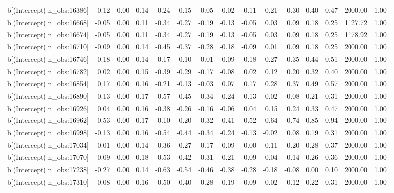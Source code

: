 \begin{table}[ht]
\begin{tabular}{rrrrrrrrrrrrrrr}
  b[(Intercept) n\_obs:16386] & 0.12 & 0.00 & 0.14 & -0.24 & -0.15 & -0.05 & 0.02 & 0.11 & 0.21 & 0.30 & 0.40 & 0.47 & 2000.00 & 1.00 \\ 
  b[(Intercept) n\_obs:16668] & -0.05 & 0.00 & 0.11 & -0.34 & -0.27 & -0.19 & -0.13 & -0.05 & 0.03 & 0.09 & 0.18 & 0.25 & 1127.72 & 1.00 \\ 
  b[(Intercept) n\_obs:16674] & -0.05 & 0.00 & 0.11 & -0.34 & -0.27 & -0.19 & -0.13 & -0.05 & 0.03 & 0.09 & 0.18 & 0.25 & 1178.92 & 1.00 \\ 
  b[(Intercept) n\_obs:16710] & -0.09 & 0.00 & 0.14 & -0.45 & -0.37 & -0.28 & -0.18 & -0.09 & 0.01 & 0.09 & 0.18 & 0.25 & 2000.00 & 1.00 \\ 
  b[(Intercept) n\_obs:16746] & 0.18 & 0.00 & 0.14 & -0.17 & -0.10 & 0.01 & 0.09 & 0.18 & 0.27 & 0.35 & 0.44 & 0.51 & 2000.00 & 1.00 \\ 
  b[(Intercept) n\_obs:16782] & 0.02 & 0.00 & 0.15 & -0.39 & -0.29 & -0.17 & -0.08 & 0.02 & 0.12 & 0.20 & 0.32 & 0.40 & 2000.00 & 1.00 \\ 
  b[(Intercept) n\_obs:16854] & 0.17 & 0.00 & 0.16 & -0.21 & -0.13 & -0.03 & 0.07 & 0.17 & 0.28 & 0.37 & 0.49 & 0.57 & 2000.00 & 1.00 \\ 
  b[(Intercept) n\_obs:16890] & -0.13 & 0.00 & 0.17 & -0.57 & -0.45 & -0.34 & -0.24 & -0.13 & -0.02 & 0.08 & 0.21 & 0.31 & 2000.00 & 1.00 \\ 
  b[(Intercept) n\_obs:16926] & 0.04 & 0.00 & 0.16 & -0.38 & -0.26 & -0.16 & -0.06 & 0.04 & 0.15 & 0.24 & 0.33 & 0.47 & 2000.00 & 1.00 \\ 
  b[(Intercept) n\_obs:16962] & 0.53 & 0.00 & 0.17 & 0.10 & 0.20 & 0.32 & 0.41 & 0.52 & 0.64 & 0.74 & 0.85 & 0.94 & 2000.00 & 1.00 \\ 
  b[(Intercept) n\_obs:16998] & -0.13 & 0.00 & 0.16 & -0.54 & -0.44 & -0.34 & -0.24 & -0.13 & -0.02 & 0.08 & 0.19 & 0.31 & 2000.00 & 1.00 \\ 
  b[(Intercept) n\_obs:17034] & 0.01 & 0.00 & 0.14 & -0.36 & -0.27 & -0.17 & -0.09 & 0.00 & 0.11 & 0.20 & 0.28 & 0.37 & 2000.00 & 1.00 \\ 
  b[(Intercept) n\_obs:17070] & -0.09 & 0.00 & 0.18 & -0.53 & -0.42 & -0.31 & -0.21 & -0.09 & 0.04 & 0.14 & 0.26 & 0.36 & 2000.00 & 1.00 \\ 
  b[(Intercept) n\_obs:17238] & -0.27 & 0.00 & 0.14 & -0.63 & -0.54 & -0.46 & -0.38 & -0.28 & -0.18 & -0.08 & 0.00 & 0.10 & 2000.00 & 1.00 \\ 
  b[(Intercept) n\_obs:17310] & -0.08 & 0.00 & 0.16 & -0.50 & -0.40 & -0.28 & -0.19 & -0.09 & 0.02 & 0.12 & 0.22 & 0.31 & 2000.00 & 1.00 \\ 

\end{tabular}
\end{table}
